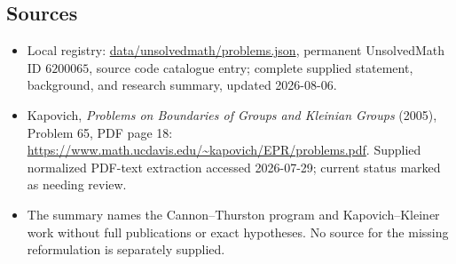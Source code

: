 \documentclass[11pt]{article}
\begin{document}
\subsection{Sources}
\begin{itemize}
\item Local registry: \url{data/unsolvedmath/problems.json}, permanent UnsolvedMath ID \(6200065\), source code catalogue entry; complete supplied statement, background, and research summary, updated 2026-08-06.
\item Kapovich, \emph{Problems on Boundaries of Groups and Kleinian Groups} (2005), Problem 65, PDF page 18: \url{https://www.math.ucdavis.edu/~kapovich/EPR/problems.pdf}. Supplied normalized PDF-text extraction accessed 2026-07-29; current status marked as needing review.
\item The summary names the Cannon--Thurston program and Kapovich--Kleiner work without full publications or exact hypotheses. No source for the missing reformulation is separately supplied.
\end{itemize}
\end{document}
